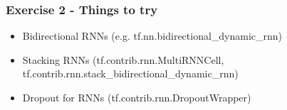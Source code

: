 \documentclass{beamer}
\begin{document}
\begin{frame}[fragile]
\frametitle{Exercise 2 - Things to try}
  \begin{itemize}
  	\item Bidirectional RNNs (e.g. tf.nn.bidirectional\_dynamic\_rnn)
  	\item Stacking RNNs (tf.contrib.rnn.MultiRNNCell, tf.contrib.rnn.stack\_bidirectional\_dynamic\_rnn)
  	\item Dropout for RNNs (tf.contrib.rnn.DropoutWrapper)
  \end{itemize}
\end{frame}

%  
%  
%
%  
%
%
%
%
%
%
%
\end{document}
